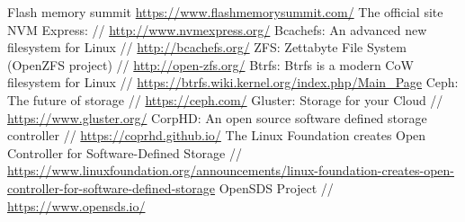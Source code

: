 \documentclass[10pt, a5paper]{article}
\begin{document}
\begin{thebibliography}{20}
Flash memory summit \url{https://www.flashmemorysummit.com/}
The official site NVM Express: // \url{http://www.nvmexpress.org/}
Bcachefs: An advanced new filesystem for Linux // \url{http://bcachefs.org/}
ZFS: Zettabyte File System (OpenZFS project) //  \url{http://open-zfs.org/}
Btrfs: Btrfs is a modern CoW filesystem for Linux // \url{https://btrfs.wiki.kernel.org/index.php/Main_Page}
Ceph: The future of storage // \url{https://ceph.com/}
Gluster: Storage for your Cloud // \url{https://www.gluster.org/}
CorpHD: An open source software defined storage controller // \url{https://coprhd.github.io/}
The Linux Foundation creates Open Controller for Software-Defined Storage // \url{https://www.linuxfoundation.org/announcements/linux-foundation-creates-open-controller-for-software-}\linebreak \url{defined-storage}
OpenSDS Project // \url{https://www.opensds.io/}
\end{thebibliography}
\end{document}
